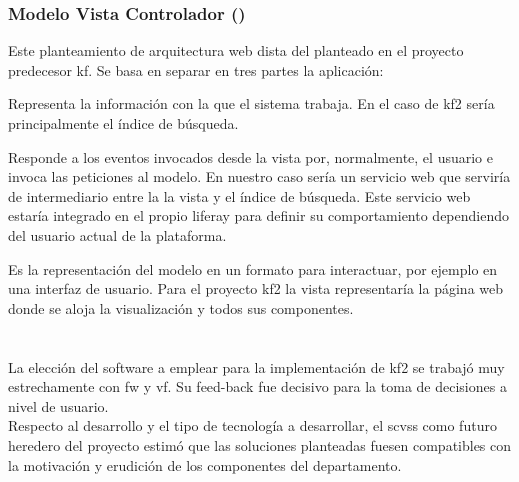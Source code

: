 \subsubsection{Modelo Vista Controlador ()}
\label{subsubsection:mvc}
Este planteamiento de arquitectura web dista del planteado en el proyecto predecesor \gls{kf}. Se basa en separar en tres partes la aplicación:

\begin{itemize}
    Representa la información con la que el sistema trabaja. En el caso de \gls{kf2} sería principalmente el índice de búsqueda. 
    
    Responde a los eventos invocados desde la vista por, normalmente, el usuario e invoca las peticiones al modelo. En nuestro caso sería un servicio web que serviría de intermediario entre la la vista y el índice de búsqueda. Este servicio web estaría integrado en el propio \gls{liferay} para definir su comportamiento dependiendo del usuario actual de la plataforma.
    
    Es la representación del modelo en un formato para interactuar, por ejemplo en una interfaz de usuario. Para el proyecto \gls{kf2} la vista representaría la página web donde se aloja la visualización y todos sus componentes.
\end{itemize}
 

\section{}
\begin{comment}
Si se ha optado por utilizar un software de base, debemos identificar y medir las diferencias entre lo que proporciona este software y los requisitos definidos para el proyecto.\\
El resultado de este análisis permitirá identificar cuáles de éstos requisitos ya están solventados total o parcialmente por el sistema base y cuales tendremos que diseñar e implementar la propuesta de solución.
\end{comment}

La elección del \gls{software} a emplear para la implementación de \gls{kf2} se trabajó muy estrechamente con \gls{fw} y \gls{vf}. Su feed-back fue decisivo para la toma de decisiones a nivel de usuario.\\

Respecto al desarrollo y el tipo de tecnología a desarrollar, el \gls{scvss} como futuro heredero del proyecto estimó que las soluciones planteadas fuesen compatibles con la motivación y erudición de los componentes del departamento.

